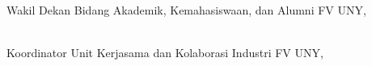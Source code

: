 \begin{minipage}{0.45\textwidth}
    \centering
    \vspace{2em}
    Wakil Dekan Bidang Akademik, Kemahasiswaan, dan Alumni FV UNY,\\[2cm]
    \fleksibelnama{\wakildekan}\\
    \fleksibelnip{\NIPwakildekan}
\end{minipage}
\hfill
\begin{minipage}{0.45\textwidth}
    \centering
    \vspace{2em}
    Koordinator Unit Kerjasama dan Kolaborasi Industri {\prodi} FV UNY,\\[2cm]
    \fleksibelnama{\koordinatorUKKI}\\
    \fleksibelnip{\NIPkoordinatorUKKI}
\end{minipage}%

